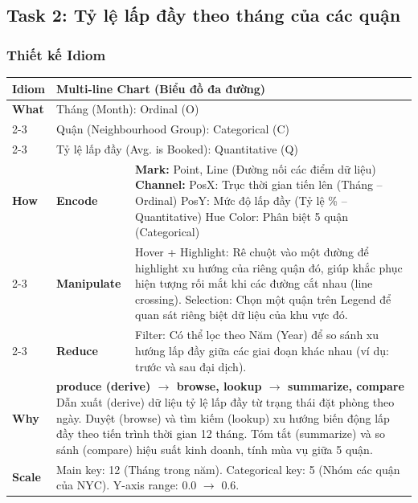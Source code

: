 \subsection{Task 2: Tỷ lệ lấp đầy theo tháng của các quận}

\subsubsection{Thiết kế Idiom}

\begin{table}[H]
\centering
\renewcommand{\arraystretch}{1.1}
\begin{tabularx}{\textwidth}{|l|l|X|}
\hline
\textbf{Idiom} & \multicolumn{2}{l|}{\textbf{Multi-line Chart (Biểu đồ đa đường)}} \\ \hline
\textbf{What}
& \multicolumn{2}{X|}{Tháng (Month): Ordinal (O)} \\ \cline{2-3}
& \multicolumn{2}{X|}{Quận (Neighbourhood Group): Categorical (C)} \\ \cline{2-3}
& \multicolumn{2}{X|}{Tỷ lệ lấp đầy (Avg. is Booked): Quantitative (Q)} \\ \hline
\textbf{How}
& \textbf{Encode} &
\textbf{Mark:} Point, Line (Đường nối các điểm dữ liệu) \newline
\textbf{Channel:} \newline
\hspace*{1em} PosX: Trục thời gian tiến lên (Tháng -- Ordinal) \newline
\hspace*{1em} PosY: Mức độ lấp đầy (Tỷ lệ \% -- Quantitative) \newline
\hspace*{1em} Hue Color: Phân biệt 5 quận (Categorical) \\ \cline{2-3}
& \textbf{Manipulate} &
Hover + Highlight: Rê chuột vào một đường để highlight xu hướng của riêng quận đó, giúp khắc phục hiện tượng rối mắt khi các đường cắt nhau (line crossing). \newline
Selection: Chọn một quận trên Legend để quan sát riêng biệt dữ liệu của khu vực đó. \\ \cline{2-3}
& \textbf{Reduce} &
Filter: Có thể lọc theo Năm (Year) để so sánh xu hướng lấp đầy giữa các giai đoạn khác nhau (ví dụ: trước và sau đại dịch). \\ \hline
\textbf{Why} & \multicolumn{2}{X|}{
\textbf{produce (derive) $\rightarrow$ browse, lookup $\rightarrow$ summarize, compare} \newline
Dẫn xuất (derive) dữ liệu tỷ lệ lấp đầy từ trạng thái đặt phòng theo ngày. Duyệt (browse) và tìm kiếm (lookup) xu hướng biến động lấp đầy theo tiến trình thời gian 12 tháng. Tóm tắt (summarize) và so sánh (compare) hiệu suất kinh doanh, tính mùa vụ giữa 5 quận.
} \\ \hline
\textbf{Scale} & \multicolumn{2}{X|}{
Main key: 12 (Tháng trong năm). \newline
Categorical key: 5 (Nhóm các quận của NYC). \newline
Y-axis range: 0.0 $\rightarrow$ 0.6.
} \\ \hline
\end{tabularx}
\end{table}

